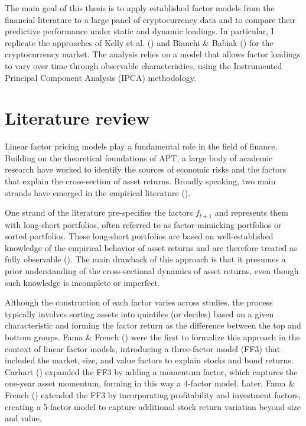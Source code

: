 \documentclass[
  12pt,
  a4paper,
  openany]{scrbook}
\begin{document}
The main goal of this thesis is to apply established factor models from
the financial literature to a large panel of cryptocurrency data and to
compare their predictive performance under static and dynamic loadings.
In particular, I replicate the approaches of Kelly et al.
() and Bianchi \& Babiak
() for the
cryptocurrency market. The analysis relies on a model that allows factor
loadings to vary over time through observable characteristics, using the
Instrumented Principal Component Analysis (IPCA) methodology.

\hfill\break
\hfill\break

\section{Literature review}\label{literature-review}

Linear factor pricing models play a fundamental role in the field of
finance. Building on the theoretical foundations of APT, a large body of
academic research have worked to identify the sources of economic risks
and the factors that explain the cross-section of asset returns. Broadly
speaking, two main strands have emerged in the empirical literature
().

One strand of the literature pre-specifies the factors \(f_{t+1}\) and
represents them with long-short portfolios, often referred to as
factor-mimicking portfolios or sorted portfolios. These long-short
portfolios are based on well-established knowledge of the empirical
behavior of asset returns and are therefore treated as fully observable
(). The
main drawback of this approach is that it presumes a prior understanding
of the cross-sectional dynamics of asset returns, even though such
knowledge is incomplete or imperfect.

Although the construction of each factor varies across studies, the
process typically involves sorting assets into quintiles (or deciles)
based on a given characteristic and forming the factor return as the
difference between the top and bottom groups. Fama \& French
() were the first to formalize
this approach in the context of linear factor models, introducing a
three-factor model (FF3) that included the market, size, and value
factors to explain stocks and bond returns. Carhart
() expanded the FF3 by
adding a momentum factor, which captures the one-year asset momentum,
forming in this way a 4-factor model. Later, Fama \& French
() extended the FF3 by
incorporating profitability and investment factors, creating a 5-factor
model to capture additional stock return variation beyond size and
value.
\end{document}

